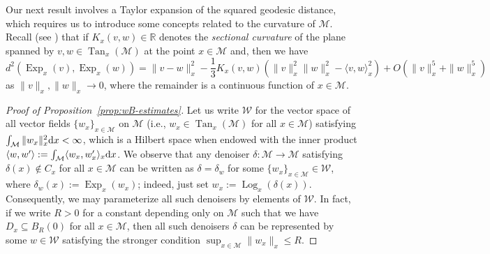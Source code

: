 \documentclass[preprint]{imsart}
\theoremstyle{plain}
\theoremstyle{definition}
\newcommand{\Rbb}{\mathbb{R}}
\newcommand{\Mcal}{\mathcal{M}}
\newcommand{\diff}{\textnormal{d}}
\DeclareMathOperator{\Tan}{Tan}
\DeclareMathOperator{\Log}{Log}
\DeclareMathOperator{\Exp}{Exp}
\DeclareMathOperator{\SO}{SO}
\begin{document}
\begin{appendix}
Our next result involves a Taylor expansion of the squared geodesic distance, which requires us to introduce some concepts related to the curvature of $\Mcal$.
Recall  (see \cite[equation~(14.1)]{VillaniOldAndNew}) that if $K_x(v,w)\in\Rbb$ denotes the \textit{sectional curvature} of the plane spanned by $v,w\in \Tan_x(\Mcal)$ at the point $x\in\Mcal$ and, then we have
\begin{equation}\label{eqn:sq-dist-Taylor}
    d^2(\Exp_x(v),\Exp_x(w)) = \|v-w\|_x^2 - \frac{1}{3} K_x(v,w)(\|v\|^2_x\|w\|_x^2-\langle v,w\rangle_x^2) + O(\|v\|_x^5 + \|w\|_x^5)
\end{equation}
as $\|v\|_x,\|w\|_x\to 0$, where the remainder is a continuous function of $x\in\Mcal$.

\medskip

\begin{proof}[Proof of Proposition~\ref{prop:wB-estimates}]
    Let us write $\mathcal{W}$ for the vector space of all vector fields $\{w_x\}_{x\in\Mcal}$ on $\Mcal$ (i.e., $w_x\in\Tan_x(\Mcal)$ for all $x\in\Mcal$) satisfying $\int_{\Mcal}\|w_x\|_x^2\diff x<\infty$, which is a Hilbert space when endowed with the inner product $\langle w,w'\rangle :=\int_{\Mcal}\langle w_x,w_x'\rangle_x\diff x$.
    We observe that any denoiser $\delta:\Mcal\to\Mcal$ satisfying $\delta(x)\notin C_x$ for all $x\in\Mcal$ can be written as $\delta = \delta_w$ for some $\{w_x\}_{x\in\Mcal}\in\mathcal{W}$, where $\delta_w(x):=\Exp_x(w_x)$; indeed, just set $w_x:=\Log_x(\delta(x))$.
    Consequently, we may parameterize all such denoisers by elements of $\mathcal{W}$.
    In fact, if we write $R>0$ for a constant depending only on $\Mcal$ such that we have $D_x\subseteq B_R(0)$ for all $x\in\Mcal$, then all such denoisers $\delta$ can be represented by some $w\in\mathcal{W}$ satisfying the stronger condition $\sup_{x\in\Mcal}\|w_x\|
    _x\le R$.
    

\end{proof}
\end{appendix}
\end{document}
